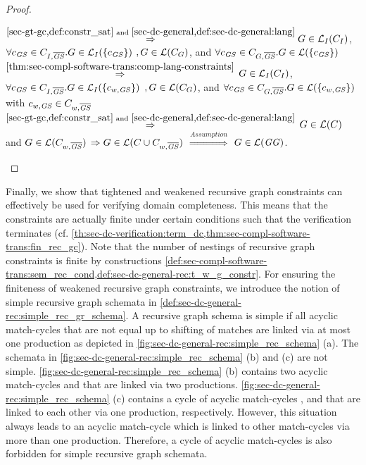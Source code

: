 \begin{proof}
\begin{enumerate}
  $\stackrel{\cref{sec-gt-gc,def:constr_sat}\text{ and }\cref{sec-dc-general,def:sec-dc-general:lang}}{\Rightarrow} G \in \Lang_I(C_I)$, $\forall c_\mathit{GS} \in C_{I,\overline{\mathit{GS}}}.G \in \mathcal{L}_I(\{c_\mathit{GS}\})$ $,G \in \mathcal{L}(C_G)$, and $\forall c_\mathit{GS} \in C_{G,\overline{\mathit{GS}}}.G \in \mathcal{L}(\{c_\mathit{GS}\})$
  $\stackrel{\cref{thm:sec-compl-software-trans:comp-lang-constraints}}{\Rightarrow}$ $G \in \mathcal{L}_I(C_I)$, $\forall c_\mathit{GS} \in C_{I,\overline{\mathit{GS}}}.G \in \mathcal{L}_I(\{c_{w,\mathit{GS}}\})$ $,G \in \mathcal{L}(C_G)$, and $\forall c_\mathit{GS} \in C_{G,\overline{\mathit{GS}}}.G \in \mathcal{L}(\{c_{w,\mathit{GS}}\})$ with $c_{w,\mathit{GS}} \in C_{w,\overline{\mathit{GS}}}$
  $\stackrel{\cref{sec-gt-gc,def:constr_sat}\text{ and }\cref{sec-dc-general,def:sec-dc-general:lang}}{\Rightarrow}$ $G \in \mathcal{L}(C)$ and $G \in \mathcal{L}(C_{w,\overline{\mathit{GS}}})$
  $\Rightarrow G \in \mathcal{L}(C \cup C_{w,\overline{\mathit{GS}}})$
  $\stackrel{Assumption}{\Rightarrow}$ $G \in \mathcal{L}(\mathit{GG})$.
\end{enumerate}
\end{proof}

Finally, we show that tightened and weakened recursive graph constraints can effectively be used for verifying domain completeness.
This means that the constraints are actually finite under certain conditions such that the verification terminates (cf. \cref{th:sec-dc-verification:term_dc,thm:sec-compl-software-trans:fin_rec_gc}).
Note that the number of nestings of recursive graph constraints is finite by constructions \cref{def:sec-compl-software-trans:sem_rec_cond,def:sec-dc-general-rec:t_w_g_constr}.
For ensuring the finiteness of weakened recursive graph constraints, we introduce the notion of simple recursive graph schemata in \cref{def:sec-dc-general-rec:simple_rec_gr_schema}.
A recursive graph schema is simple if all acyclic match-cycles that are not equal up to shifting of matches are linked via at most one production as depicted in \cref{fig:sec-dc-general-rec:simple_rec_schema} (a).
The schemata in \cref{fig:sec-dc-general-rec:simple_rec_schema} (b) and (c) are not simple.
\cref{fig:sec-dc-general-rec:simple_rec_schema} (b) contains two acyclic match-cycles  and  that are linked via two productions.
\cref{fig:sec-dc-general-rec:simple_rec_schema} (c) contains a cycle of acyclic match-cycles ,  and  that are linked to each other via one production, respectively.
However, this situation always leads to an acyclic match-cycle  which is linked to other match-cycles via more than one production. 
Therefore, a cycle of acyclic match-cycles is also forbidden for simple recursive graph schemata.

